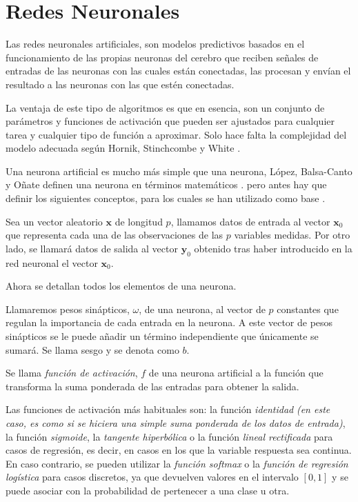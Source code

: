 \newpage
\section{Redes Neuronales}

\noindent Las redes neuronales artificiales, son modelos predictivos basados en el funcionamiento de las propias neuronas del cerebro que reciben señales de entradas de las neuronas con las cuales están conectadas, las procesan y envían el resultado a las neuronas con las que estén conectadas. 

\noindent La ventaja de este tipo de algoritmos es que en esencia, son un conjunto de parámetros y funciones de activación que pueden ser ajustados para cualquier tarea y cualquier tipo de función a aproximar. Solo hace falta la complejidad del modelo adecuada según Hornik, Stinchcombe y  White \cite{Hornik 1989}.  

\noindent Una neurona artificial es mucho más simple que una neurona, López,  Balsa-Canto y  Oñate definen una neurona en términos matemáticos \cite{Roberto 2008}. pero antes hay que definir los siguientes conceptos, para los cuales se han utilizado como base \cite{Grossi 2007, Neural Designer}.

\noindent Sea un vector aleatorio $\mathbf{x}$ de longitud $p$, llamamos datos de entrada al vector $\mathbf{x}_0$ que representa cada una de las observaciones de las $p$  variables medidas. Por otro lado, se llamará datos de salida al vector $\mathbf{y}_0$ obtenido tras haber introducido en la red neuronal el vector $\mathbf{x}_0$.

\noindent Ahora se detallan todos los elementos de una neurona. 

\begin{defi}
Llamaremos pesos sinápticos, $\omega$, de una neurona, al vector de $p$ constantes que regulan la importancia de cada entrada en la neurona.  A este vector de pesos sinápticos se le puede añadir un término independiente que únicamente se sumará. Se llama sesgo y se denota como $b$.
\end{defi}

\begin{defi}
Se llama \emph{función de activación}, $f$ de una neurona artificial a la función que transforma la suma ponderada de las entradas para obtener la salida. 

\noindent Las funciones de activación más habituales son: la función \emph{identidad} \emph{(en este caso, es como si se hiciera una simple suma ponderada de los datos de entrada)}, la función \emph{sigmoide}, la \emph{tangente hiperbólica} o la función \emph{lineal rectificada} para casos de regresión, es decir, en casos en los que la variable respuesta sea continua. En caso contrario, se pueden utilizar la \emph{función softmax} o la \emph{función de regresión logística} para casos discretos, ya que devuelven valores en el intervalo $[0,1]$ y se puede asociar con la probabilidad de pertenecer a una clase u otra. 
\end{defi}

